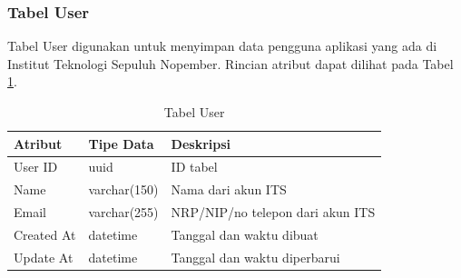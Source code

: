 \subsubsection{Tabel User}
\par Tabel User digunakan untuk menyimpan data pengguna aplikasi yang ada di Institut Teknologi Sepuluh Nopember. Rincian atribut dapat dilihat pada Tabel \ref{tabel_user}.
\begin{longtable}{|p{2cm}|p{2.5cm}|p{4.5cm}|}
 	\caption{Tabel User} \label{tabel_user} \\ \hline
    {Atribut} & {Tipe Data} & {Deskripsi} \\ \hline
    User ID & uuid & ID tabel \\ \hline
    Name & varchar(150) & Nama dari akun ITS \\ \hline
    Email & varchar(255) & NRP/NIP/no telepon dari akun ITS \\ \hline
    Created At & datetime & Tanggal dan waktu dibuat \\ \hline
    Update At & datetime & Tanggal dan waktu diperbarui \\ \hline
\end{longtable}

